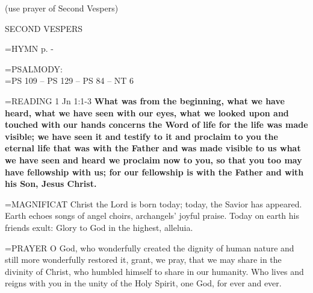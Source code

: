 (use prayer of Second Vespers)

\begin{flushleft}\normalsize SECOND VESPERS\\\end{flushleft}

\hangindent=\parindent \small{\uppercase{HYMN} p. \pageref{christmas:firstHymn}-\pageref{christmas:lastHymn}\\}

\hangindent=\parindent \small{PSALMODY:}\\
\hangindent=\parindent  PS 109 -- PS 129 -- PS 84 -- NT 6\vspace{0.5em}

\hangindent=\parindent \small{\uppercase{READING}}    1 Jn 1:1-3 \textbf{   What was from the beginning, what we have heard, what we have seen with our eyes, what we looked upon and touched with our hands concerns the Word of life for the life was made visible; we have seen it and testify to it and proclaim to you the eternal life that was with the Father and was made visible to us what we have seen and heard we proclaim now to you, so that you too may have fellowship with us; for our fellowship is with the Father and with his Son, Jesus Christ.\\}

\hangindent=\parindent \small{MAGNIFICAT 	Christ the Lord is born today; today, the Savior has appeared. Earth echoes songs of angel choirs, archangels' joyful praise. Today on earth his friends exult: Glory to God in the highest, alleluia.\\}

\hangindent=\parindent \small{PRAYER 	O God, who wonderfully created the dignity of human nature and still more wonderfully restored it, grant, we pray, that we may share in the divinity of Christ, who humbled himself to share in our humanity. Who lives and reigns with you in the unity of the Holy Spirit, one God, for ever and ever.}
